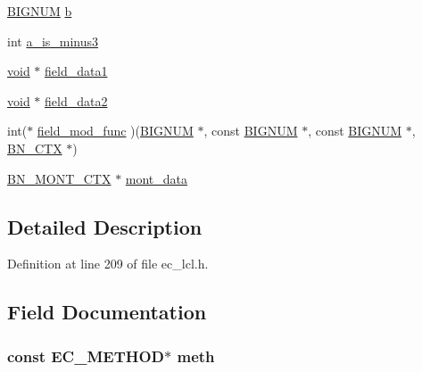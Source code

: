 \begin{DoxyCompactItemize}
\item 
\hyperlink{crypto_2ossl__typ_8h_a6fb19728907ec6515e4bfb716bffa141}{B\+I\+G\+N\+UM} \hyperlink{structec__group__st_a008329742e963f3782a1f9b50dbdcdb6}{b}
\item 
int \hyperlink{structec__group__st_aa1917fe500bd4cec2aea8bac75c6c13d}{a\+\_\+is\+\_\+minus3}
\item 
\hyperlink{hw__4758__cca_8h_afad4d591c7931ff6dc5bf69c76c96aa0}{void} $\ast$ \hyperlink{structec__group__st_abdc185e794bba4077b792e966be5c435}{field\+\_\+data1}
\item 
\hyperlink{hw__4758__cca_8h_afad4d591c7931ff6dc5bf69c76c96aa0}{void} $\ast$ \hyperlink{structec__group__st_a6e8eed171bec01191f1a38a6b851a65e}{field\+\_\+data2}
\item 
int($\ast$ \hyperlink{structec__group__st_a2dddf08e66879e1949ce622cf6c384d8}{field\+\_\+mod\+\_\+func} )(\hyperlink{crypto_2ossl__typ_8h_a6fb19728907ec6515e4bfb716bffa141}{B\+I\+G\+N\+UM} $\ast$, const \hyperlink{crypto_2ossl__typ_8h_a6fb19728907ec6515e4bfb716bffa141}{B\+I\+G\+N\+UM} $\ast$, const \hyperlink{crypto_2ossl__typ_8h_a6fb19728907ec6515e4bfb716bffa141}{B\+I\+G\+N\+UM} $\ast$, \hyperlink{crypto_2ossl__typ_8h_a0b235a35b7dd7922c097571ecd90e2bc}{B\+N\+\_\+\+C\+TX} $\ast$)
\item 
\hyperlink{crypto_2ossl__typ_8h_aec902d353e00ced6d3fee6cd033a8bd0}{B\+N\+\_\+\+M\+O\+N\+T\+\_\+\+C\+TX} $\ast$ \hyperlink{structec__group__st_a4f816320c2bd645dc74414f7e321a4d4}{mont\+\_\+data}
\end{DoxyCompactItemize}


\subsection{Detailed Description}


Definition at line 209 of file ec\+\_\+lcl.\+h.



\subsection{Field Documentation}
\subsubsection[{\texorpdfstring{meth}{meth}}]{\setlength{\rightskip}{0pt plus 5cm}const {\bf E\+C\+\_\+\+M\+E\+T\+H\+OD}$\ast$ meth}\hypertarget{structec__group__st_a2fc1498c0eb6bf4c024e00e73b172708}{}\label{structec__group__st_a2fc1498c0eb6bf4c024e00e73b172708}


